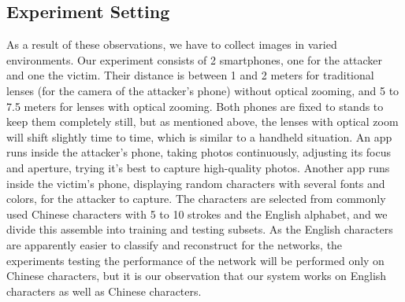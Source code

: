 \subsection{Experiment Setting}
As a result of these observations, we have to collect images in varied environments. Our experiment consists of 2 smartphones, one for the attacker and one the victim. Their distance is between 1 and 2 meters for traditional lenses (for the camera of the attacker's phone) without optical zooming, and 5 to 7.5 meters for lenses with optical zooming. Both phones are fixed to stands to keep them completely still, but as mentioned above, the lenses with optical zoom will shift slightly time to time, which is similar to a handheld situation. An app runs inside the attacker's phone, taking photos continuously, adjusting its focus and aperture, trying it's best to capture high-quality photos. Another app runs inside the victim's phone, displaying random characters with several fonts and colors, for the attacker to capture. The characters are selected from commonly used Chinese characters with 5 to 10 strokes and the English alphabet, and we divide this assemble into training and testing subsets. As the English characters are apparently easier to classify and reconstruct for the networks, the experiments testing the performance of the network will be performed only on Chinese characters, but it is our observation that our system works on English characters as well as Chinese characters.

